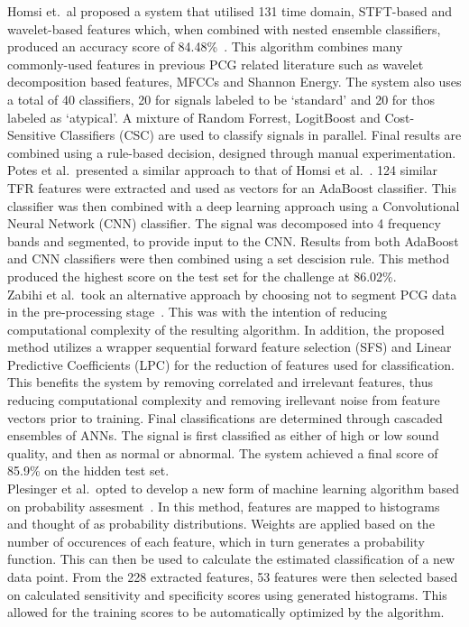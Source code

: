 \documentclass[titlepage, 12pt]{scrartcl} \usepackage{enumitem}
\begin{document}
Homsi et.\ al proposed a system that utilised 131 time domain, STFT-based and
wavelet-based features which, when combined with nested ensemble classifiers,
produced an accuracy score of 84.48\%~\parencite{Homsi2017}. This algorithm
combines many commonly-used features in previous PCG related literature such as
wavelet decomposition based features, MFCCs and Shannon Energy. The system also
uses a total of 40 classifiers, 20 for signals labeled to be `standard' and 20
for thos labeled as `atypical'. A mixture of Random Forrest, LogitBoost and
Cost-Sensitive Classifiers (CSC) are used to classify signals in parallel.
Final results are combined using a rule-based decision, designed through manual
experimentation.\\

Potes et al.\ presented a similar approach to that of Homsi et
al.~\parencite{Potes2016}. 124 similar TFR features were extracted and used as
vectors for an AdaBoost classifier. This classifier was then combined with a
deep learning approach using a Convolutional Neural Network (CNN) classifier.
The signal was decomposed into 4 frequency bands and segmented, to provide
input to the CNN. Results from both AdaBoost and CNN classifiers were then
combined using a set descision rule.  This method produced the highest score on
the test set for the challenge at 86.02\%.\\

Zabihi et al.\ took an alternative approach by choosing not to segment PCG data
in the pre-processing stage~\parencite{Zabihi2016}. This was with the intention
of reducing computational complexity of the resulting algorithm. In addition,
the proposed method utilizes a wrapper sequential forward feature selection
(SFS) and Linear Predictive Coefficients (LPC) for the reduction of features
used for classification. This benefits the system by removing correlated and
irrelevant features, thus reducing computational complexity and removing
irellevant noise from feature vectors prior to training.  Final classifications
are determined through cascaded ensembles of ANNs. The signal is first
classified as either of high or low sound quality, and then as normal or
abnormal. The system achieved a final score of 85.9\% on the hidden test set.\\

Plesinger et al.\ opted to develop a new form of machine learning algorithm
based on probability assesment~\parencite{Plesinger2017}. In this method,
features are mapped to histograms and thought of as probability distributions.
Weights are applied based on the number of occurences of each feature, which in
turn generates a probability function. This can then be used to calculate the
estimated classification of a new data point. From the 228 extracted features,
53 features were then selected based on calculated sensitivity and specificity
scores using generated histograms. This allowed for the training scores to be
automatically optimized by the algorithm.\\
\end{document}
